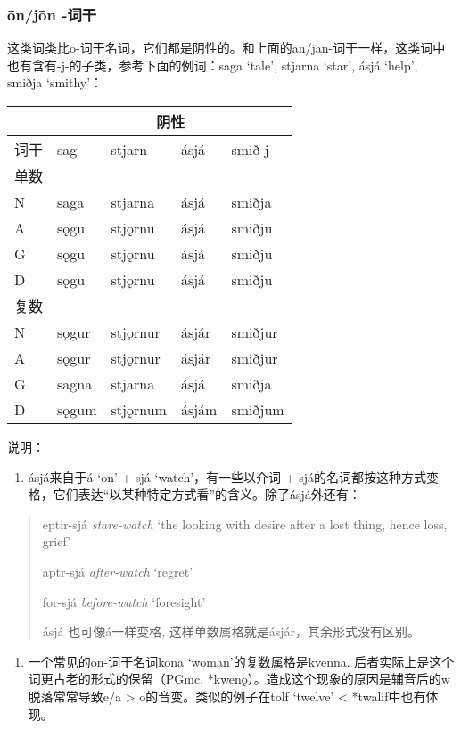 \subsubsection{ōn/jōn -词干}\label{onjon--ux8bcdux5e72}

这类词类比ō-词干名词，它们都是阴性的。和上面的an/jan-词干一样，这类词中也有含有-j-的子类，参考下面的例词：saga
`tale', stjarna `star', ásjá `help', smiðja `smithy'：

\begin{longtable}{lllll}
\toprule
 &\multicolumn{4}{c}{阴性} \\
\midrule
\endhead
\bottomrule
\endfoot
词干 & sag- & stjarn- & ásjá- & smið-j- \\
单数 & & & & \\
N & saga & stjarna & ásjá & smiðja \\
A & sǫgu & stjǫrnu & ásjá & smiðju \\
G & sǫgu & stjǫrnu & ásjá & smiðju \\
D & sǫgu & stjǫrnu & ásjá & smiðju \\
复数 & & & & \\
N & sǫgur & stjǫrnur & ásjár & smiðjur \\
A & sǫgur & stjǫrnur & ásjár & smiðjur \\
G & sagna & stjarna & ásjá & smiðja \\
D & sǫgum & stjǫrnum & ásjám & smiðjum \\
\end{longtable}

说明：

\begin{enumerate}
\def\labelenumi{\arabic{enumi})}
\item
  ásjá来自于á `on' + sjá `watch'，有一些以介词 +
  sjá的名词都按这种方式变格，它们表达``以某种特定方式看''的含义。除了ásjá外还有：
\end{enumerate}

\begin{quote}
eptir-sjá \emph{stare-watch} `the looking with desire after a lost
thing, hence loss, grief'

aptr-sjá \emph{after-watch} `regret'

for-sjá \emph{before-watch} `foresight'

ásjá 也可像á一样变格, 这样单数属格就是ásjár，其余形式没有区别。
\end{quote}

\begin{enumerate}
\def\labelenumi{\arabic{enumi})}
\setcounter{enumi}{1}
\item
  一个常见的ōn-词干名词kona `woman'的复数属格是kvenna.
  后者实际上是这个词更古老的形式的保留（PGmc.
  *kwenǭ）。造成这个现象的原因是辅音后的w脱落常常导致e/a \textgreater{}
  o的音变。类似的例子在tolf `twelve' \textless{} *twalif中也有体现。
\end{enumerate}

